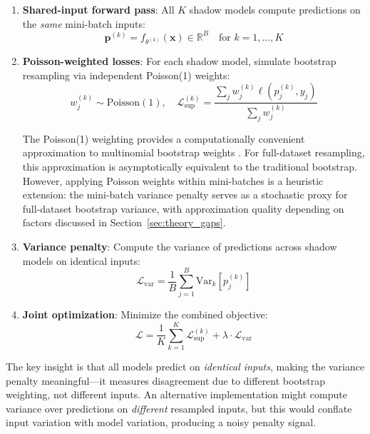\documentclass[12pt, letterpaper]{article}
\begin{document}
\begin{enumerate}
\item \textbf{Shared-input forward pass}: All $K$ shadow models compute predictions on the \emph{same} mini-batch inputs:
\begin{equation}
\mathbf{p}^{(k)} = f_{\theta^{(k)}}(\mathbf{x}) \in \mathbb{R}^B \quad \text{for } k = 1, \ldots, K
\end{equation}

\item \textbf{Poisson-weighted losses}: For each shadow model, simulate bootstrap resampling via independent Poisson(1) weights:
\begin{equation}
w_j^{(k)} \sim \text{Poisson}(1), \quad \mathcal{L}_{\text{sup}}^{(k)} = \frac{\sum_j w_j^{(k)} \ell(p_j^{(k)}, y_j)}{\sum_j w_j^{(k)}}
\end{equation}

The Poisson(1) weighting provides a computationally convenient approximation to multinomial bootstrap weights \citep{hanley2006poisson, chamandy2012estimating}. For full-dataset resampling, this approximation is asymptotically equivalent to the traditional bootstrap. However, applying Poisson weights within mini-batches is a heuristic extension: the mini-batch variance penalty serves as a stochastic proxy for full-dataset bootstrap variance, with approximation quality depending on factors discussed in Section~\ref{sec:theory_gaps}.

\item \textbf{Variance penalty}: Compute the variance of predictions across shadow models on identical inputs:
\begin{equation}
\mathcal{L}_{\text{var}} = \frac{1}{B}\sum_{j=1}^B \text{Var}_k[p_j^{(k)}]
\end{equation}

\item \textbf{Joint optimization}: Minimize the combined objective:
\begin{equation}
\mathcal{L} = \frac{1}{K}\sum_{k=1}^K \mathcal{L}_{\text{sup}}^{(k)} + \lambda \cdot \mathcal{L}_{\text{var}}
\end{equation}
\end{enumerate}

The key insight is that all models predict on \emph{identical inputs}, making the variance penalty meaningful---it measures disagreement due to different bootstrap weighting, not different inputs. An alternative implementation might compute variance over predictions on \emph{different} resampled inputs, but this would conflate input variation with model variation, producing a noisy penalty signal.
\end{document}
